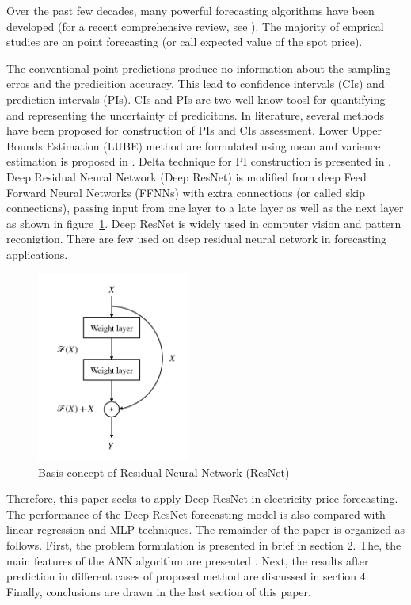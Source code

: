 \documentclass[review]{elsarticle}
\begin{document}
    Over the past few decades, many powerful forecasting algorithms have been developed (for a recent comprehensive review, see \cite{Weron2014}). The majority of emprical studies are on point forecasting (or call expected value of the spot price).

    The conventional point predictions produce no information about the sampling erros and the predicition accuracy. This lead to confidence intervals (CIs) and prediction intervals (PIs). CIs and PIs are two well-know toosl for quantifying and representing the uncertainty of predicitons. In literature, several methods have been proposed for construction of PIs and CIs assessment. Lower Upper Bounds Estimation (LUBE) method are formulated using mean and varience estimation is proposed in \cite{Khosravi2011}. Delta technique for PI construction is presented in \cite{KhosraviA2010}.
    Deep Residual Neural Network (Deep ResNet) is modified from deep Feed Forward Neural Networks (FFNNs) with extra connections (or called skip connections), passing input from one layer to a late layer as well as the next layer as shown in figure~\ref{Fig:Basic_DRNN}. Deep ResNet is widely used in computer vision and pattern reconigtion. There are few used on deep residual neural network in forecasting applications.
    \begin{figure}[H]
      \centering
      \includegraphics[width=5cm]{basic_DRNN}
      \caption{Basis concept of Residual Neural Network (ResNet)}
      \label{Fig:Basic_DRNN}
    \end{figure}
    Therefore, this paper seeks to apply Deep ResNet in electricity price forecasting. The performance of the Deep ResNet forecasting model is also compared with linear regression and MLP techniques.
    The remainder of the paper is organized as follows. First, the problem formulation is presented in brief in section 2. The, the main features of the ANN algorithm are presented . Next, the results after prediction in different cases of proposed method  are discussed in section 4. Finally, conclusions are drawn in the last section of this paper.
\end{document}
